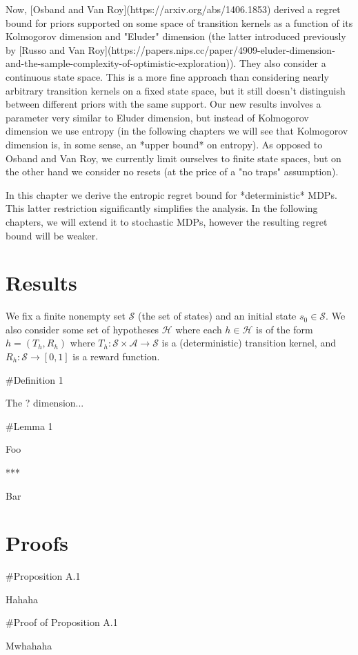 \documentclass[a4paper]{article}
\newcommand{\AP}[1]{\left(#1\right)}
\newcommand{\A}{\mathcal{A}}
\newcommand{\St}{\mathcal{S}}
\newcommand{\Hy}{\mathcal{H}}
\begin{document}
Now, [Osband and Van Roy](https://arxiv.org/abs/1406.1853) derived a regret bound for priors supported on some space of transition kernels as a function of its Kolmogorov dimension and "Eluder" dimension (the latter introduced previously by [Russo and Van Roy](https://papers.nips.cc/paper/4909-eluder-dimension-and-the-sample-complexity-of-optimistic-exploration)). They also consider a continuous state space. This is a more fine approach than considering nearly arbitrary transition kernels on a fixed state space, but it still doesn't distinguish between different priors with the same support. Our new results involves a parameter very similar to Eluder dimension, but instead of Kolmogorov dimension we use entropy (in the following chapters we will see that Kolmogorov dimension is, in some sense, an *upper bound* on entropy). As opposed to Osband and Van Roy, we currently limit ourselves to finite state spaces, but on the other hand we consider no resets (at the price of a "no traps" assumption).

In this chapter we derive the entropic regret bound for *deterministic* MDPs. This latter restriction significantly simplifies the analysis. In the following chapters, we will extend it to stochastic MDPs, however the resulting regret bound will be weaker.

\section{Results}

We fix a finite nonempty set $\St$ (the set of states) and an initial state $s_0 \in \St$. We also consider some set of hypotheses $\Hy$ where each $h\in\Hy$ is of the form $h=\AP{T_h,R_h}$ where $T_h: \St \times \A \rightarrow \St$ is a (deterministic) transition kernel, and $R_h: \St \rightarrow [0,1]$ is a reward function.

\#Definition 1

The ? dimension...

\#Lemma 1

Foo

***

Bar

\section{Proofs}

\#Proposition A.1

Hahaha

\#Proof of Proposition A.1

Mwhahaha
\end{document}
